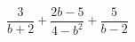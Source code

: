 \begin{ex}[type=expression]
	\begin{condition}
		\(\dfrac{3}{b+2}+\dfrac{2b-5}{4-b^2}+\dfrac{5}{b-2}\)
	\end{condition}
\end{ex}